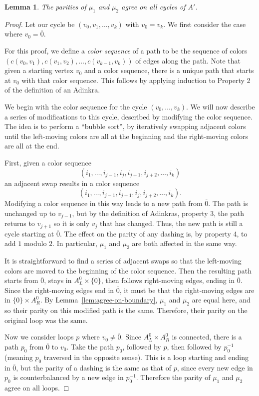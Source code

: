 \documentclass[12pt,twoside,singlespace]{article}
\numberwithin{equation}{section}
\newtheorem{lem}[equation]{Lemma}
\theoremstyle{definition}
\begin{document}
\begin{lem}
\label{lem:switch12}
The parities of $\mu_1$ and $\mu_2$ agree on all cycles of $A'$.
\end{lem}
\begin{proof}
Let our cycle be $(v_0,v_1,\ldots,v_k)$ with $v_0=v_k$.  We first consider the case where $v_0=\overline{0}$.

For this proof, we define a \emph{color sequence} of a path to be the sequence of colors $(c(v_0,v_1),c(v_1,v_2),\ldots,c(v_{k-1},v_k))$ of edges along the path.  Note that given a starting vertex $v_0$ and a color sequence, there is a unique path that starts at $v_0$ with that color sequence.  This follows by applying induction to Property 2 of the definition of an Adinkra.

We begin with the color sequence for the cycle $(v_0,\ldots,v_k)$.  We will now describe a series of modifications to this cycle, described by modifying the color sequence.  The idea is to perform a ``bubble sort'', by iteratively swapping adjacent colors until the left-moving colors are all at the beginning and the right-moving colors are all at the end.

First, given a color sequence
\[(i_1,\ldots,i_{j-1},i_j,i_{j+1},i_{j+2},\ldots,i_k)\]
an adjacent swap results in a color sequence
\[(i_1,\ldots,i_{j-1},i_{j+1},i_j,i_{j+2},\ldots,i_k).\]
Modifying a color sequence in this way leads to a new path from $\overline{0}$.  The path is unchanged up to $v_{j-1}$, but by the definition of Adinkras, property 3, the path returns to $v_{j+1}$ so it is only $v_j$ that has changed.  Thus, the new path is still a cycle starting at $\overline{0}$.  The effect on the parity of any dashing is, by property 4, to add $1$ modulo $2$.  In particular, $\mu_1$ and $\mu_2$ are both affected in the same way.

It is straightforward to find a series of adjacent swaps so that the left-moving colors are moved to the beginning of the color sequence.  Then the resulting path starts from $\overline{0}$, stays in $A_L^0\times\{0\}$, then follows right-moving edges, ending in $\overline{0}$.  Since the right-moving edges end in $\overline{0}$, it must be that the right-moving edges are in $\{0\}\times A_R^0$.  By Lemma~\ref{lem:agree-on-boundary}, $\mu_1$ and $\mu_2$ are equal here, and so their parity on this modified path is the same.  Therefore, their parity on the original loop was the same.

Now we consider loops $p$ where $v_0\not=\overline{0}$.  Since $A_L^0\times A_R^0$ is connected, there is a path $p_0$ from $\overline{0}$ to $v_0$.  Take the path $p_0$, followed by $p$, then followed by $p_0^{-1}$ (meaning $p_0$ traversed in the opposite sense).  This is a loop starting and ending in $\overline{0}$, but the parity of a dashing is the same as that of $p$, since every new edge in $p_0$ is counterbalanced by a new edge in $p_0^{-1}$.  Therefore the parity of $\mu_1$ and $\mu_2$ agree on all loops.
\end{proof}
\end{document}
